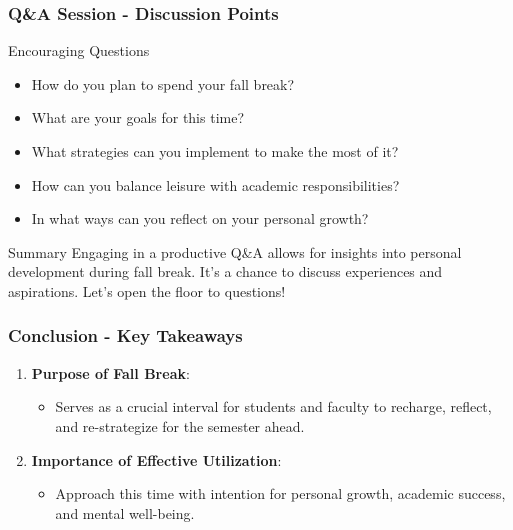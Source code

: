 \documentclass[aspectratio=169]{beamer}
\begin{document}
\begin{frame}[fragile]
    \frametitle{Q\&A Session - Discussion Points}
    \begin{block}{Encouraging Questions}
        \begin{itemize}
            \item How do you plan to spend your fall break?
            \item What are your goals for this time?
            \item What strategies can you implement to make the most of it?
            \item How can you balance leisure with academic responsibilities?
            \item In what ways can you reflect on your personal growth?
        \end{itemize}
    \end{block}
    
    \begin{block}{Summary}
        Engaging in a productive Q\&A allows for insights into personal development during fall break. It's a chance to discuss experiences and aspirations.
        Let's open the floor to questions!
    \end{block}
\end{frame}

\begin{frame}[fragile]
    \frametitle{Conclusion - Key Takeaways}
    \begin{enumerate}
        \item \textbf{Purpose of Fall Break}: 
        \begin{itemize}
            \item Serves as a crucial interval for students and faculty to recharge, reflect, and re-strategize for the semester ahead.
        \end{itemize}
        
        \item \textbf{Importance of Effective Utilization}:
        \begin{itemize}
            \item Approach this time with intention for personal growth, academic success, and mental well-being.
        \end{itemize}
    \end{enumerate}
\end{frame}
\end{document}
